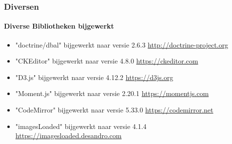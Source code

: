 \begin{frame}[fragile]
	\frametitle{Diversen}
	\framesubtitle{Diverse Bibliotheken bijgewerkt}

	\begin{itemize}
		\item "doctrine/dbal" bijgewerkt naar versie 2.6.3\newline
			\smaller
				\href{http://doctrine-project.org}{http://doctrine-project.org}
			\normalsize

		\item "CKEditor" bijgewerkt naar versie 4.8.0\newline
			\smaller
				\href{https://ckeditor.com}{https://ckeditor.com}
			\normalsize

		\item "D3.js" bijgewerkt naar versie 4.12.2\newline
			\smaller
				\href{https://d3js.org}{https://d3js.org}
			\normalsize

		\item "Moment.js" bijgewerkt naar versie 2.20.1\newline
			\smaller
				\href{https://momentjs.com}{https://momentjs.com}
			\normalsize

		\item "CodeMirror" bijgewerkt naar versie 5.33.0\newline
			\smaller
				\href{https://codemirror.net}{https://codemirror.net}
			\normalsize

		\item "imagesLoaded" bijgewerkt naar versie 4.1.4\newline
			\smaller
				\href{https://imagesloaded.desandro.com}{https://imagesloaded.desandro.com}
			\normalsize

	\end{itemize}

\end{frame}

